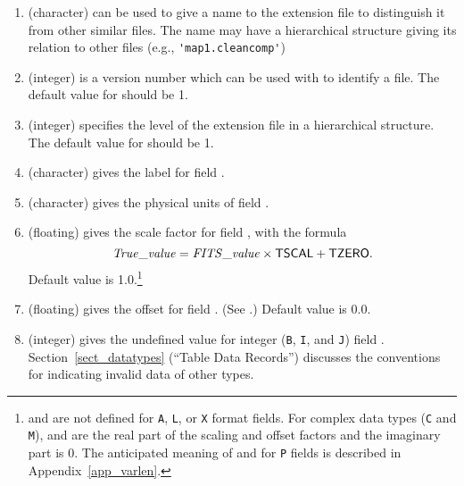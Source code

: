 \begin{enumerate} %
\item {} (character) can be used to give a name to the
extension file to distinguish it from other similar files.  The name
may have a hierarchical structure giving its relation to other files
(e.g., \verb|'map1.cleancomp'|)
\item {} (integer) is a version number which can be used
with   to
identify a file.
The default value for  should be 1.

\item {} (integer) specifies the level of the extension
file in a hierarchical structure.  The default value for
 should be 1. 
\item {} (character) gives the label for field .  
\item {} (character) gives the physical units of field .
\item {} (floating) gives the scale factor for field
, with the formula
$${\it True\_value\/} = {\it FITS\_value\/}\times{\sf TSCAL}+{\sf TZERO}.$$
Default value is 1.0.\footnote{ 
 and  are not defined for \verb|A|,
\verb|L|, or \verb|X| format fields.  For complex data types (\verb|C|
and \verb|M|),  and  are the real part of the
scaling and offset factors and the imaginary part is 0.  The
anticipated meaning of  and  for \verb|P|
fields is described in Appendix~\ref{app_varlen}.
}
\item {} (floating) gives the offset for field
. (See .) Default value is 0.0.

\item {} (integer) gives the undefined value for
integer (\verb|B|, \verb|I|, and \verb|J|) field .
Section~\ref{sect_datatypes} (``Table Data Records'') discusses the
conventions for indicating invalid data of other types.


\end{enumerate}
